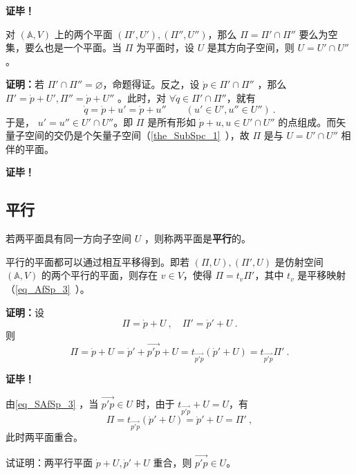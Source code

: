\textbf{证毕！}
\begin{corollary}{}
对 $(\mathbb A,V)$ 上的两个平面 $(\Pi',U'),(\Pi'',U'')$，那么 $\Pi=\Pi'\cap\Pi''$ 要么为空集，要么也是一个平面。当 $\Pi$ 为平面时，设 $U$ 是其方向子空间，则 $U=U'\cap U''$。
\end{corollary}
\textbf{证明：}若 $\Pi'\cap\Pi''=\varnothing$，命题得证。反之，设 $\dot p\in \Pi'\cap\Pi''$ ，那么 $\Pi'=\dot p+U',\Pi''=\dot p+U''$ 。此时，对 $\forall\dot q\in\Pi'\cap\Pi''$，就有 \begin{equation}
\dot q=\dot p+u'=\dot p+u''\qquad (u'\in U',u''\in U'')~.
\end{equation}
于是， $u'=u''\in U'\cap U''$。即 $\Pi$ 是所有形如 $\dot p+u,u\in U'\cap U''$ 的点组成。而矢量子空间的交仍是个矢量子空间（\autoref{the_SubSpc_1}~），故 $\Pi$ 是与 $U=U'\cap U''$ 相伴的平面。

\textbf{证毕！}
\subsection{平行}

\begin{definition}{}
若两平面具有同一方向子空间 $U$ ，则称两平面是\textbf{平行}的。
\end{definition}
\begin{theorem}{}
平行的平面都可以通过相互平移得到。即若 $(\Pi,U),(\Pi',U)$ 是仿射空间 $(\mathbb A,V)$ 的两个平行的平面，则存在 $v\in V$，使得 $\Pi=t_{v}\Pi'$，其中 $t_v$ 是平移映射（\autoref{eq_AfSp_3}~）。
\end{theorem}
\textbf{证明：}设
\begin{equation}
\Pi=\dot p+U~,\quad \Pi'=\dot p'+U~.
\end{equation}
则
\begin{equation}\label{eq_SAfSp_3}
\Pi=\dot p+U=\dot p'+\overrightarrow{p'p}+U=t_{\overrightarrow{p'p}}(\dot p'+U)=t_{\overrightarrow{p'p}} \Pi'~.
\end{equation}

\textbf{证毕！}

由\autoref{eq_SAfSp_3} ，当 $\overrightarrow{p'p}\in U$ 时，由于 $t_{\overrightarrow{p'p}}+U=U$，有
\begin{equation}
\Pi=t_{\overrightarrow{p'p}}(\dot p'+U)=\dot p'+U=\Pi'~,
\end{equation}
此时两平面重合。
\begin{exercise}{}
试证明：两平行平面 $\dot p+U,\dot p'+U$ 重合，则 $\overrightarrow{p'p}\in U$。
\end{exercise}